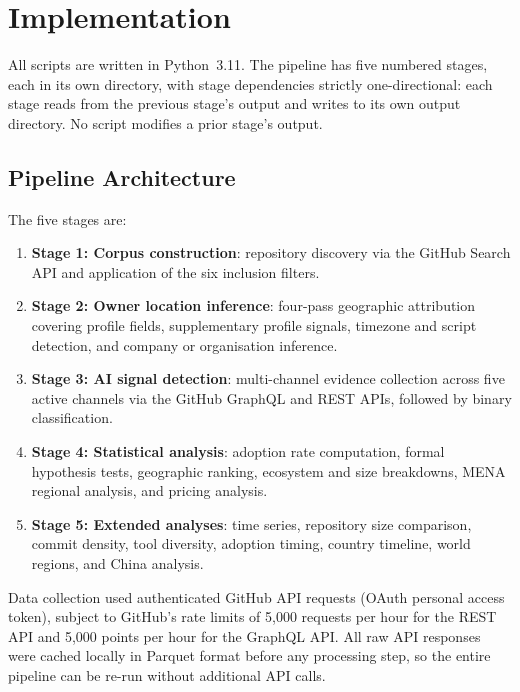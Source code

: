 
\chapter{Implementation}
\label{chap:implementation}

All scripts are written in Python~3.11. The pipeline has five numbered stages, each in its own directory, with stage dependencies strictly one-directional: each stage reads from the previous stage's output and writes to its own output directory. No script modifies a prior stage's output.

\section{Pipeline Architecture}
\label{sec:impl:architecture}

The five stages are:

\begin{enumerate}
  \item \textbf{Stage 1: Corpus construction}: repository discovery via the GitHub Search API and application of the six inclusion filters.
  \item \textbf{Stage 2: Owner location inference}: four-pass geographic attribution covering profile fields, supplementary profile signals, timezone and script detection, and company or organisation inference.
  \item \textbf{Stage 3: AI signal detection}: multi-channel evidence collection across five active channels via the GitHub GraphQL and REST APIs, followed by binary classification.
  \item \textbf{Stage 4: Statistical analysis}: adoption rate computation, formal hypothesis tests, geographic ranking, ecosystem and size breakdowns, MENA regional analysis, and pricing analysis.
  \item \textbf{Stage 5: Extended analyses}: time series, repository size comparison, commit density, tool diversity, adoption timing, country timeline, world regions, and China analysis.
\end{enumerate}

Data collection used authenticated GitHub API requests (OAuth personal access token), subject to GitHub's rate limits of 5,000 requests per hour for the REST API and 5,000 points per hour for the GraphQL API. All raw API responses were cached locally in Parquet format before any processing step, so the entire pipeline can be re-run without additional API calls.

